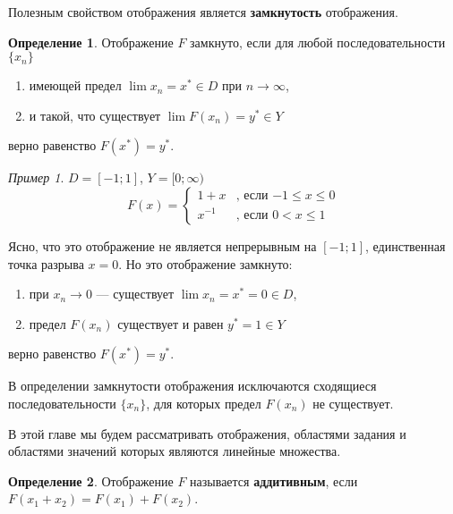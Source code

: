 \documentclass[12pt,a4paper,titlepage,oneside]{book}
\theoremstyle{definition}
\newtheorem*{definition}{Определение}
\theoremstyle{plain}
\theoremstyle{remark}
\theoremstyle{remark}
\newtheorem*{example}{Пример}
\theoremstyle{remark}
\theoremstyle{remark}
\theoremstyle{plain}
\theoremstyle{plain}
\begin{document}
Полезным свойством отображения является \textbf{замкнутость} отображения.

\begin{definition} Отображение $F$ замкнуто, если для любой последовательности  $\lbrace x_n \rbrace$

\begin{enumerate}

 \item имеющей предел $\lim x_n= x^* \in D$ при $n\to\infty$,
 
 \item и такой, что существует $\lim F(x_n)= y^* \in Y$
 
\end{enumerate} 
 
верно равенство $F(x^*)=y^*$.

\end{definition}

\begin{example}
$D=[-1;1]$, $Y=[0;\infty)$
\begin{equation*}
F(x) = 
\begin{cases}
   1+x &\text{, если $-1\leqslant x \leqslant 0$}\\
   x^{-1} &\text{, если $0< x \leqslant 1$}
\end{cases}
\end{equation*}

Ясно, что это отображение не является непрерывным на $[-1;1]$, единственная точка разрыва $x=0$. Но это отображение замкнуто:

\begin{enumerate}

 \item при $x_n \to 0$ --- существует $\lim x_n= x^*=0 \in D$,
 
 \item предел $F(x_n)$ существует и равен $y^*=1 \in Y$
 
\end{enumerate}
верно равенство $F(x^*)=y^*$.

\end{example}

В определении замкнутости отображения исключаются сходящиеся последовательности $\lbrace x_n \rbrace$, для которых предел $F(x_n)$ не существует.

В этой главе мы будем рассматривать отображения, областями задания и областями значений которых являются линейные множества.

\begin{definition} Отображение $F$ называется \textbf{аддитивным}, если $F(x_1+x_2)=F(x_1)+F(x_2)$.
\end{definition}
\end{document}
